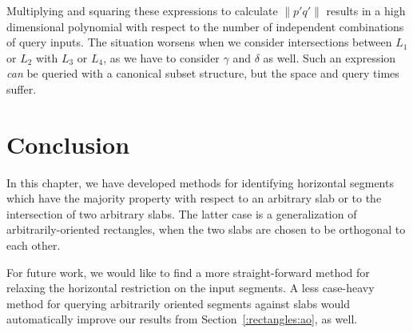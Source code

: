 Multiplying and squaring these expressions to calculate $\|p'q'\|$ results in a high dimensional polynomial with respect to the number of independent combinations of query inputs.
The situation worsens when we consider intersections between $L_1$ or $L_2$ with $L_3$ or $L_4$, as we have to consider $\gamma$ and $\delta$ as well.
Such an expression \emph{can} be queried with a canonical subset structure, but the space and query times suffer.

\section{Conclusion}
\label{:slabs:concl}

In this chapter, we have developed methods for identifying horizontal segments which have the majority property with respect to an arbitrary slab or to the intersection of two arbitrary slabs.  The latter case is a generalization of arbitrarily-oriented rectangles, when the two slabs are chosen to be orthogonal to each other.

For future work, we would like to find a more straight-forward method for relaxing the horizontal restriction on the input segments.  
A less case-heavy method for querying arbitrarily oriented segments against slabs would automatically improve our results from Section~\ref{:rectangles:ao}, as well.
